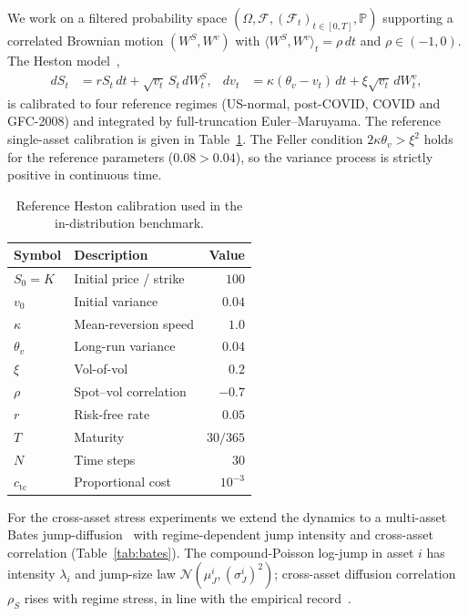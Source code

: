 \documentclass[10pt,letterpaper]{article}
\newcommand{\PP}{\mathbb{P}}
\begin{document}
We work on a filtered probability space
$(\Omega,\mathcal{F},(\mathcal{F}_t)_{t\in[0,T]},\PP)$ supporting a
correlated Brownian motion $(W^S,W^v)$ with
$\langle W^S,W^v\rangle_t=\rho\, dt$ and $\rho\in(-1,0)$. The Heston
model~\citep{heston1993closed},
\begin{align}
dS_t &= rS_t\, dt + \sqrt{v_t}\,S_t\, dW_t^S, &
dv_t &= \kappa(\theta_v - v_t)\, dt + \xi\sqrt{v_t}\, dW_t^v,
\label{eq:heston}
\end{align}
is calibrated to four reference regimes (US-normal, post-COVID,
COVID and GFC-2008) and integrated by full-truncation
Euler--Maruyama. The reference single-asset calibration is given in
Table~\ref{tab:heston}. The Feller condition $2\kappa\theta_v>\xi^2$
holds for the reference parameters ($0.08>0.04$), so the variance
process is strictly positive in continuous time.

\begin{table}[ht]
\centering\small
\caption{Reference Heston calibration used in the in-distribution
benchmark.}
\label{tab:heston}
\begin{tabular}{@{}llr@{}}
\toprule
\textbf{Symbol} & \textbf{Description} & \textbf{Value} \\\midrule
$S_0 = K$ & Initial price / strike & $100$ \\
$v_0$ & Initial variance & $0.04$ \\
$\kappa$ & Mean-reversion speed & $1.0$ \\
$\theta_v$ & Long-run variance & $0.04$ \\
$\xi$ & Vol-of-vol & $0.2$ \\
$\rho$ & Spot--vol correlation & $-0.7$ \\
$r$ & Risk-free rate & $0.05$ \\
$T$ & Maturity & $30/365$ \\
$N$ & Time steps & $30$ \\
$c_{\mathrm{tc}}$ & Proportional cost & $10^{-3}$ \\
\bottomrule
\end{tabular}
\end{table}

For the cross-asset stress experiments we extend the dynamics to a
multi-asset Bates jump-diffusion~\citep{bates1996jumps} with
regime-dependent jump intensity and cross-asset correlation
(Table~\ref{tab:bates}). The compound-Poisson log-jump in asset $i$
has intensity $\lambda_i$ and jump-size law
$\mathcal{N}(\mu_J^i,(\sigma_J^i)^2)$; cross-asset diffusion
correlation $\rho_S$ rises with regime stress, in line with the
empirical record~\citep{cont2001empirical}.
\end{document}

